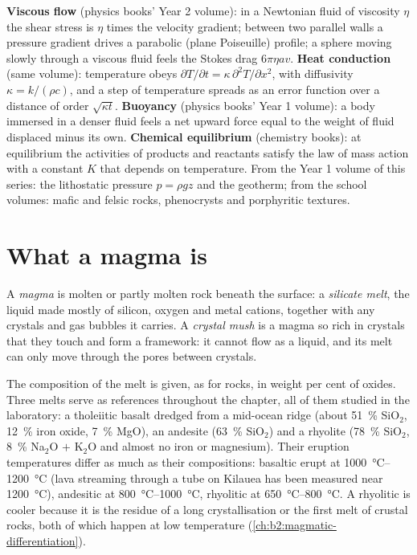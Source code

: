 \begin{recall}
\textbf{Viscous flow} (physics books' Year 2 volume): in a Newtonian fluid of
viscosity $\eta$ the shear stress is $\eta$ times the velocity gradient; between
two parallel walls a pressure gradient drives a parabolic (plane Poiseuille)
profile; a sphere moving slowly through a viscous fluid feels the Stokes drag
$6\pi\eta a v$. \textbf{Heat conduction} (same volume): temperature obeys
$\partial T/\partial t = \kappa\,\partial^2T/\partial x^2$, with diffusivity $\kappa = k/(\rho
c)$, and a step of temperature spreads as an error function over a distance of
order $\sqrt{\kappa t}$. \textbf{Buoyancy} (physics books' Year 1 volume): a body
immersed in a denser fluid feels a net upward force equal to the weight of fluid
displaced minus its own. \textbf{Chemical equilibrium} (chemistry books): at
equilibrium the activities of products and reactants satisfy the law of mass
action with a constant $K$ that depends on temperature. From the Year 1 volume
of this series: the lithostatic pressure $p = \rho g z$ and the geotherm; from the
school volumes: mafic and felsic rocks, phenocrysts and porphyritic textures.
\end{recall}

\section{What a magma is}

\begin{definition}[Magma]\label{def:b2:magma-emplacement:magma}
A \emph{magma} is molten or partly molten rock beneath the surface: a
\emph{silicate melt}, the liquid made mostly of silicon,
oxygen and metal cations, together with any crystals and gas bubbles it carries.
A \emph{crystal mush} is a magma so rich in crystals that they
touch and form a framework: it cannot flow as a liquid, and its melt can only
move through the pores between crystals.
\end{definition}

The composition of the melt is given, as for rocks, in weight per cent of
oxides. Three melts serve as references throughout the chapter, all of them
studied in the laboratory: a tholeiitic basalt dredged from a mid-ocean ridge
(about \qty{51}{\percent} SiO$_2$, \qty{12}{\percent} iron oxide, \qty{7}{\percent}
MgO), an andesite (\qty{63}{\percent} SiO$_2$) and a rhyolite (\qty{78}{\percent}
SiO$_2$, \qty{8}{\percent} Na$_2$O $+$ K$_2$O and almost no iron or magnesium).
Their eruption temperatures differ as much as their compositions: basaltic
 erupt at \qtyrange{1000}{1200}{\celsius} (lava streaming through a tube on
Kilauea has been measured near \qty{1200}{\celsius}), andesitic  at
\qtyrange{800}{1000}{\celsius}, rhyolitic  at \qtyrange{650}{800}{\celsius}.
A rhyolitic  is cooler because it is the residue of a long crystallisation
or the first melt of crustal rocks, both of which happen at low temperature
(\cref{ch:b2:magmatic-differentiation}).

